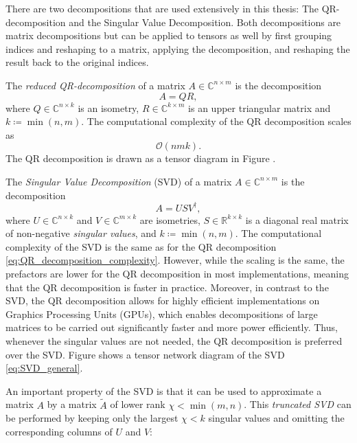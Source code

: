 There are two decompositions that are used extensively in this thesis: The QR-decomposition and the Singular Value Decomposition. Both decompositions are matrix decompositions but can be applied to tensors as well by first grouping indices and reshaping to a matrix, applying the decomposition, and reshaping the result back to the original indices. \par
The \textit{reduced QR-decomposition} of a matrix $A \in \mathbb{C}^{n\times m}$ is the decomposition
\begin{equation}
	\label{eq:QR_decomposition_general}
	A = QR,
\end{equation}
where $Q\in\mathbb{C}^{n\times k}$ is an isometry, $R\in\mathbb{C}^{k\times m}$ is an upper triangular matrix and $k \coloneqq \min(n, m)$. The computational complexity of the QR decomposition scales as
\begin{equation}
	\label{eq:QR_decomposition_complexity}
	\mathcal{O}\left(nmk\right).
\end{equation}
The QR decomposition is drawn as a tensor diagram in Figure . \par
The \textit{Singular Value Decomposition} (SVD) of a matrix $A \in \mathbb{C}^{n\times m}$ is the decomposition
\begin{equation}
	\label{eq:SVD_general}
	A = USV^\dagger,
\end{equation}
where $U\in\mathbb{C}^{n\times k}$ and $V\in\mathbb{C}^{m\times k}$ are isometries, $S\in\mathbb{R}^{k\times k}$ is a diagonal real matrix of non-negative \textit{singular values}, and $k \coloneqq \min(n, m)$. The computational complexity of the SVD is the same as for the QR decomposition \eqref{eq:QR_decomposition_complexity}. However, while the scaling is the same, the prefactors are lower for the QR decomposition in most implementations, meaning that the QR decomposition is faster in practice. Moreover, in contrast to the SVD, the QR decomposition allows for highly efficient implementations on Graphics Processing Units (GPUs), which enables decompositions of large matrices to be carried out significantly faster and more power efficiently. Thus, whenever the singular values are not needed, the QR decomposition is preferred over the SVD. Figure  shows a tensor network diagram of the SVD \eqref{eq:SVD_general}. \par
An important property of the SVD is that it can be used to approximate a matrix $A$ by a matrix $\tilde{A}$ of lower rank $\chi < \min(m, n)$. This \textit{truncated SVD} can be performed by keeping only the largest $\chi < k$ singular values and omitting the corresponding columns of $U$ and $V$:

